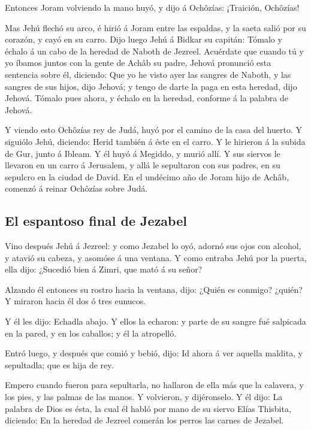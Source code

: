  Entonces Joram volviendo la mano huyó, y dijo á Ochôzías:
¡Traición, Ochôzías!

 Mas Jehú flechó su arco, é hirió á Joram entre las
espaldas, y la saeta salió por su corazón, y cayó en su carro.
 Dijo luego Jehú á Bidkar su capitán: Tómalo y échalo á un
cabo de la heredad de Naboth de Jezreel. Acuérdate que cuando tú y yo
íbamos juntos con la gente de Achâb su padre, Jehová pronunció esta
sentencia sobre él, diciendo:  Que yo he visto ayer las
sangres de Naboth, y las sangres de sus hijos, dijo Jehová; y tengo de
darte la paga en esta heredad, dijo Jehová. Tómalo pues ahora, y échalo
en la heredad, conforme á la palabra de Jehová.

 Y viendo esto Ochôzías rey de Judá, huyó por el camino de
la casa del huerto. Y siguiólo Jehú, diciendo: Herid también á éste en
el carro. Y le hirieron á la subida de Gur, junto á Ibleam. Y él huyó á
Megiddo, y murió allí.  Y sus siervos le llevaron en un
carro á Jerusalem, y allá le sepultaron con sus padres, en su sepulcro
en la ciudad de David.  En el undécimo año de Joram hijo de
Achâb, comenzó á reinar Ochôzías sobre Judá.

\hypertarget{el-espantoso-final-de-jezabel}{%
\subsection{El espantoso final de
Jezabel}\label{el-espantoso-final-de-jezabel}}

 Vino después Jehú á Jezreel: y como Jezabel lo oyó, adornó
sus ojos con alcohol, y atavió su cabeza, y asomóse á una ventana.
 Y como entraba Jehú por la puerta, ella dijo: ¿Sucedió
bien á Zimri, que mató á su señor?

 Alzando él entonces su rostro hacia la ventana, dijo:
¿Quién es conmigo? ¿quién? Y miraron hacia él dos ó tres eunucos.

 Y él les dijo: Echadla abajo. Y ellos la echaron: y parte
de su sangre fué salpicada en la pared, y en los caballos; y él la
atropelló.

 Entró luego, y después que comió y bebió, dijo: Id ahora á
ver aquella maldita, y sepultadla; que es hija de rey.

 Empero cuando fueron para sepultarla, no hallaron de ella
más que la calavera, y los pies, y las palmas de las manos.
 Y volvieron, y dijéronselo. Y él dijo: La palabra de Dios
es ésta, la cual él habló por mano de su siervo Elías Thisbita,
diciendo: En la heredad de Jezreel comerán los perros las carnes de
Jezabel.

